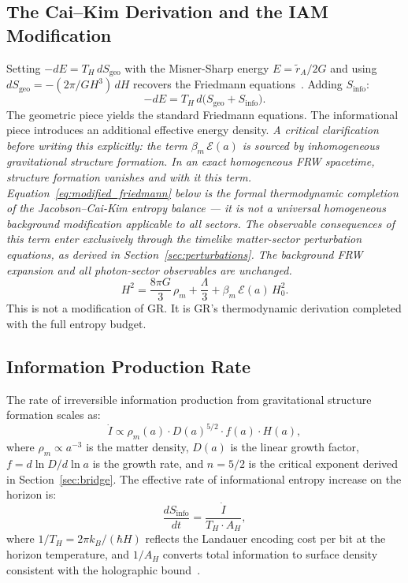 \documentclass[12pt,a4paper]{article}
\begin{document}
\subsection{The Cai--Kim Derivation and the IAM Modification}

Setting $-dE = T_H\,dS_\mathrm{geo}$ with the Misner-Sharp energy
$E = \tilde{r}_A/2G$ and using
$dS_\mathrm{geo} = -(2\pi/GH^3)\,dH$ recovers the Friedmann
equations~\citep{CaiKim2005}. Adding $S_\mathrm{info}$:
\begin{equation}
-dE = T_H\,d\bigl(S_\mathrm{geo} + S_\mathrm{info}\bigr).
\label{eq:modified_first_law}
\end{equation}
The geometric piece yields the standard Friedmann equations. The
informational piece introduces an additional effective energy density.
\textit{A critical clarification before writing this explicitly: the
term $\beta_m\,\mathcal{E}(a)$ is sourced by inhomogeneous
gravitational structure formation. In an exact homogeneous FRW
spacetime, structure formation vanishes and with it this term.
Equation~\eqref{eq:modified_friedmann} below is the formal
thermodynamic completion of the Jacobson--Cai-Kim entropy balance ---
it is not a universal homogeneous background modification applicable
to all sectors. The observable consequences of this term enter
exclusively through the timelike matter-sector perturbation equations,
as derived in Section~\ref{sec:perturbations}. The background FRW
expansion and all photon-sector observables are unchanged.}
\begin{equation}
H^2 = \frac{8\pi G}{3}\,\rho_m + \frac{\Lambda}{3}
  + \beta_m\,\mathcal{E}(a)\,H_0^2.
\label{eq:modified_friedmann}
\end{equation}
This is not a modification of GR. It is GR's thermodynamic derivation
completed with the full entropy budget.

\subsection{Information Production Rate}

The rate of irreversible information production from gravitational
structure formation scales as:
\begin{equation}
\dot{I} \propto \rho_m(a)\cdot D(a)^{5/2}\cdot f(a)\cdot H(a),
\label{eq:Idot}
\end{equation}
where $\rho_m \propto a^{-3}$ is the matter density, $D(a)$ is the
linear growth factor, $f = d\ln D/d\ln a$ is the growth rate, and
$n = 5/2$ is the critical exponent derived in
Section~\ref{sec:bridge}. The effective rate of informational entropy
increase on the horizon is:
\begin{equation}
\frac{dS_\mathrm{info}}{dt}
= \frac{\dot{I}}{T_H \cdot A_H},
\label{eq:dSinfo_rate}
\end{equation}
where $1/T_H = 2\pi k_B/(\hbar H)$ reflects the Landauer encoding
cost per bit at the horizon temperature, and $1/A_H$ converts total
information to surface density consistent with the holographic
bound~\citep{tHooft1993,Susskind1995}.
\end{document}
